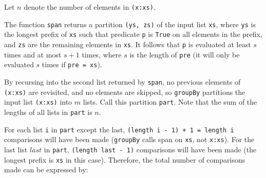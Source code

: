 \documentclass[../main.tex]{subfiles}
\begin{document}






Let $n$ denote the number of elements in \texttt{(x:xs)}.

The function \texttt{span} returns a partition \texttt{(ys, zs)} of the input list \texttt{xs}, where \texttt{ys} is the longest prefix of \texttt{xs} such that predicate \texttt{p} is \texttt{True} on all elements in the prefix, and \texttt{zs} are the remaining elements in \texttt{xs}.  It follows that \texttt{p} is evaluated at least $s$ times and at most $s + 1$ times, where $s$ is the length of \texttt{pre} (it will only be evaluated $s$ times if \texttt{pre = xs}).

By recursing into the second list returned by \texttt{span}, no previous elements of \texttt{(x:xs)} are revisited, and no elements are skipped, so \texttt{groupBy} partitions the input list \texttt{(x:xs)} into $m$ lists.  Call this partition \texttt{part}.  Note that the sum of the lengths of all lists in \texttt{part} is $n$.

For each list \texttt{i} in \texttt{part} except the last, \texttt{(length i - 1) + 1 = length i} comparisons will have been made (\texttt{groupBy} calls span on \texttt{xs}, not \texttt{x:xs}).  For the last list $last$ in \texttt{part}, \texttt{(length last - 1)} comparisons will have been made (the longest prefix is \texttt{xs} in this case).  Therefore, the total number of comparisons made can be expressed by:
\end{document}
